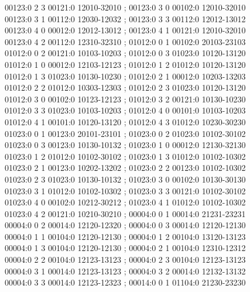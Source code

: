 \documentclass[11pt]{article}
\theoremstyle{remark}
\numberwithin{equation}{section}
\begin{document}
\begin{flushleft}
00123:0 2 3 00121:0 12010-32010 ; 00123:0 3 0 00102:0 12010-32010\\
00123:0 3 1 00112:0 12030-12032 ; 00123:0 3 3 00112:0 12012-13012\\
00123:0 4 0 00012:0 12012-13012 ; 00123:0 4 1 00121:0 12010-32010\\
00123:0 4 2 00112:0 12310-32310 ; 01012:0 0 1 00102:0 20103-23103\\
01012:0 0 2 00121:0 10103-10203 ; 01012:0 0 3 01023:0 10120-13120\\
01012:0 1 0 00012:0 12103-12123 ; 01012:0 1 2 01012:0 10120-13120\\
01012:0 1 3 01023:0 10130-10230 ; 01012:0 2 1 00012:0 10203-13203\\
01012:0 2 2 01012:0 10303-12303 ; 01012:0 2 3 01023:0 10120-13120\\
01012:0 3 0 00102:0 10123-12123 ; 01012:0 3 2 00121:0 10130-10230\\
01012:0 3 3 01023:0 10103-10203 ; 01012:0 4 0 00101:0 10103-10203\\
01012:0 4 1 00101:0 10120-13120 ; 01012:0 4 3 01012:0 10230-30230\\
01023:0 0 1 00123:0 20101-23101 ; 01023:0 0 2 01023:0 10102-30102\\
01023:0 0 3 00123:0 10130-10132 ; 01023:0 1 0 00012:0 12130-32130\\
01023:0 1 2 01012:0 10102-30102 ; 01023:0 1 3 01012:0 10102-10302\\
01023:0 2 1 00123:0 10202-13202 ; 01023:0 2 2 00123:0 10102-10302\\
01023:0 2 3 01023:0 10130-10132 ; 01023:0 3 0 00102:0 10130-30130\\
01023:0 3 1 01012:0 10102-10302 ; 01023:0 3 3 00121:0 10102-30102\\
01023:0 4 0 00102:0 10212-30212 ; 01023:0 4 1 01012:0 10102-10302\\
01023:0 4 2 00121:0 10210-30210 ; 00004:0 0 1 00014:0 21231-23231\\
00004:0 0 2 00014:0 12120-12320 ; 00004:0 0 3 00014:0 12120-12130\\
00004:0 1 1 00104:0 12120-12130 ; 00004:0 1 2 00104:0 13120-13123\\
00004:0 1 3 00104:0 12120-12130 ; 00004:0 2 1 00104:0 12310-12312\\
00004:0 2 2 00104:0 12123-13123 ; 00004:0 2 3 00104:0 12123-13123\\
00004:0 3 1 00014:0 12123-13123 ; 00004:0 3 2 00014:0 12132-13132\\
00004:0 3 3 00014:0 12123-12323 ; 00014:0 0 1 01104:0 21230-23230\\

\end{flushleft}
\end{document}
